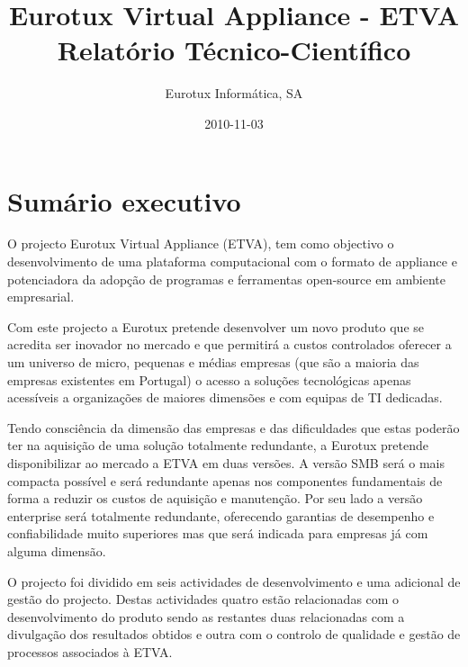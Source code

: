 \documentclass[a4paper,12pt,portugues]{article}
\title{Eurotux Virtual Appliance - ETVA\\
Relatório Técnico-Científico}
\author{Eurotux Informática, SA}
\date{2010-11-03}
\begin{document}
\ifpdf
{}
\else
{}
\fi

\maketitle



\section{Sumário executivo} %
\label{sec:sumario_executivo}



O projecto Eurotux Virtual Appliance (ETVA), tem como objectivo o
desenvolvimento de uma plataforma computacional com o formato de appliance e
potenciadora da adopção de programas e ferramentas open-source em ambiente
empresarial.

Com este projecto a Eurotux pretende desenvolver um novo produto que se
acredita ser inovador no mercado e que permitirá a custos controlados oferecer
a um universo de micro, pequenas e médias empresas (que são a maioria das
empresas existentes em Portugal) o acesso a soluções tecnológicas apenas
acessíveis a organizações de maiores dimensões e com equipas de TI dedicadas.

Tendo consciência da dimensão das empresas e das dificuldades que estas
poderão ter na aquisição de uma solução totalmente redundante, a Eurotux
pretende disponibilizar ao mercado a ETVA em duas versões. A versão SMB será o
mais compacta possível e será redundante apenas nos componentes fundamentais
de forma a reduzir os custos de aquisição e manutenção. Por seu lado a versão
enterprise será totalmente redundante, oferecendo garantias de desempenho e
confiabilidade muito superiores mas que será indicada para empresas já com
alguma dimensão.

O projecto foi dividido em seis actividades de desenvolvimento e uma adicional
de gestão do projecto. Destas actividades quatro estão relacionadas com o
desenvolvimento do produto sendo as restantes duas relacionadas com a
divulgação dos resultados obtidos e outra com o controlo de qualidade e gestão
de processos associados à ETVA.
\end{document}
